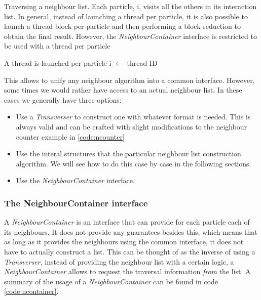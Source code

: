 \documentclass[ twoside,openright,titlepage,numbers=noenddot,%
headinclude,footinclude,cleardoublepage=empty,abstract=on,
BCOR=5mm,paper=a4,fontsize=11pt, dvipsnames
]{scrreprt}
\begin{document}
\begin{algorithm}
  \caption{Traversing a neighbour list. Each particle, i, visits all the others in its interaction list.
    In general, instead of launching a thread per particle, it is also possible to launch a thread block per particle and then performing a block reduction to obtain the final result. However, the \emph{NeighbourContainer} interface is restricted to be used with a thread per particle}\label{alg:nlist}
  \begin{algorithmic}[1]
    \Require A thread is launched per particle
    \State i $\gets$ thread ID 
    \EndFor
  \end{algorithmic}
\end{algorithm}

This allows to unify any neighbour algorithm into a common interface. However, some times we would rather have access to an actual neighbour list. In these cases we generally have three options:
\begin{itemize}
\item Use a \emph{Transverser} to construct one with whatever format is needed.
  This is always valid and can be crafted with slight modifications to the neighbour counter example in \ref{code:ncounter}
\item Use the interal structures that the particular neighbour list construction algorithm.
  We will see how to do this case by case in the following sections.
\item Use the \emph{NeighbourContainer} interface.
\end{itemize}

\subsubsection{The NeighbourContainer interface}\label{sec:ncontainer}
A \emph{NeighbourContainer} is an interface that can provide for each particle each of its neighbours. It does not provide any guarantees besides this, which means that as long as it provides the neighbours using the common interface, it does not have to actually construct a list. This can be thought of as the inverse of using a \emph{Transverser}, instead of providing the neighbour list with a certain logic, a \emph{NeighbourContainer} allows to request the traversal information \emph{from} the list. A summary of the usage of a \emph{NeighbourContainer} can be found in code \ref{code:ncontainer}.
\end{document}
